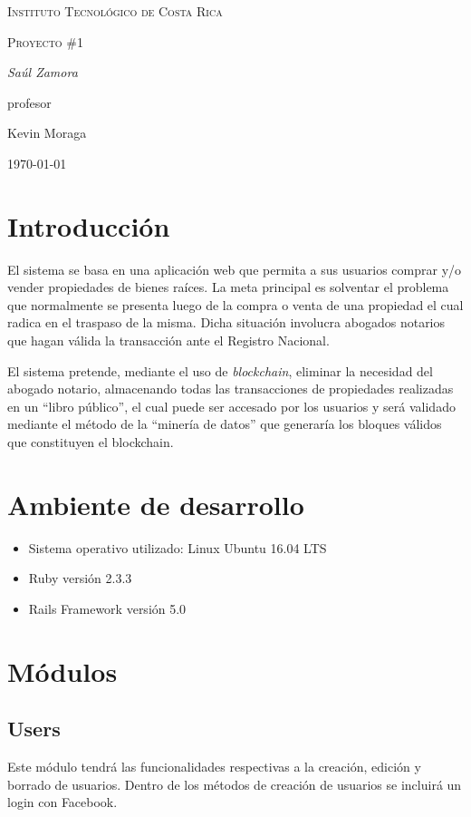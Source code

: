 \documentclass{article}
\begin{document}
\begin{titlepage}
  \centering
  {\scshape\LARGE Instituto Tecnol\'ogico de Costa Rica \par}
  \vspace{1cm}
  {\scshape\Large Proyecto \#1\par}
  \vspace{1.5cm}
  {\Large\itshape Sa\'ul Zamora\par}
  \vfill
  profesor\par
  Kevin Moraga \textsc{}

  \vfill

  {\large \today\par}
\end{titlepage}

\section{Introducci\'on}
El sistema se basa en una aplicaci\'on web que permita a sus usuarios comprar y/o vender propiedades de bienes ra\'ices. La meta principal es solventar el problema que normalmente se presenta luego de la compra o venta de una propiedad el cual radica en el traspaso de la misma. Dicha situaci\'on involucra abogados notarios que hagan v\'alida la transacci\'on ante el Registro Nacional.

El sistema pretende, mediante el uso de \emph{blockchain}, eliminar la necesidad del abogado notario, almacenando todas las transacciones de propiedades realizadas en un ``libro p\'ublico'', el cual puede ser accesado por los usuarios y ser\'a validado mediante el m\'etodo de la ``miner\'ia de datos'' que generar\'ia los bloques v\'alidos que constituyen el blockchain.

\section{Ambiente de desarrollo}
\begin{itemize}
  \item Sistema operativo utilizado: Linux Ubuntu 16.04 LTS
  \item Ruby versi\'on 2.3.3
  \item Rails Framework versi\'on 5.0
\end{itemize}

\section{M\'odulos}
\subsection{Users}
Este m\'odulo tendr\'a las funcionalidades respectivas a la creaci\'on, edici\'on y borrado de usuarios. Dentro de los m\'etodos de creaci\'on de usuarios se incluir\'a un login con Facebook.
\end{document}
